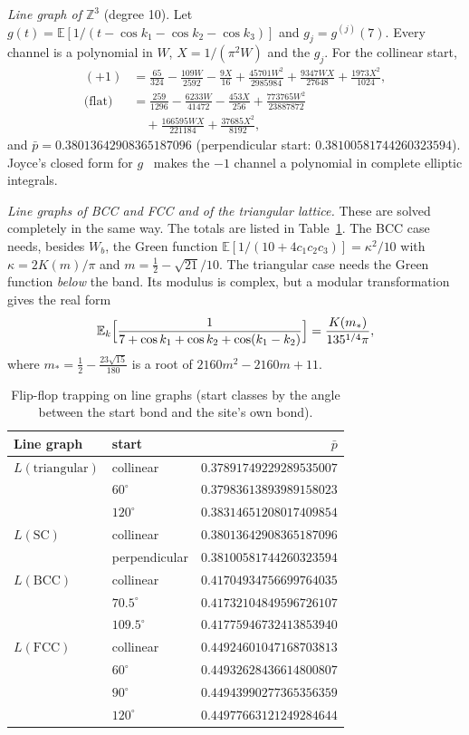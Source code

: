 \documentclass[aps,pra,10pt,twocolumn,superscriptaddress,nofootinbib]{revtex4-2}
\newcommand{\E}{\mathbb{E}}
\newcommand{\pbar}{\bar{p}}
\begin{document}
\emph{Line graph of $\mathbb{Z}^3$} (degree 10). Let $g(t)=\E[1/(t-\cos k_1-\cos k_2-\cos k_3)]$ and
$g_j=g^{(j)}(7)$. Every channel is a polynomial in $W$, $X=1/(\pi^2W)$ and the $g_j$. For the collinear start,
\begin{align}
(+1)&=\tfrac{65}{324}-\tfrac{109W}{2592}-\tfrac{9X}{16}+\tfrac{45701W^2}{2985984}
+\tfrac{9347WX}{27648}+\tfrac{1973X^2}{1024},\nonumber\\
\text{(flat)}&=\tfrac{259}{1296}-\tfrac{6233W}{41472}-\tfrac{453X}{256}
+\tfrac{773765W^2}{23887872}\nonumber\\
&\quad+\tfrac{166595WX}{221184}+\tfrac{37685X^2}{8192},
\end{align}
and $\pbar=0.38013642908365187096$ (perpendicular start: $0.38100581744260323594$).
Joyce's closed form for $g$~\cite{Joyce1994} makes the $-1$ channel a polynomial in
complete elliptic integrals.

\emph{Line graphs of BCC and FCC and of the triangular lattice.} These are solved completely
in the same way. The totals are listed in Table~\ref{tab:lg}. The BCC case needs, besides $W_b$,
the Green function $\E[1/(10+4c_1c_2c_3)]=\kappa^2/10$ with $\kappa=2K(m)/\pi$ and
$m=\tfrac12-\sqrt{21}/10$. The triangular case needs the Green function \emph{below} the band.
Its modulus is complex, but a modular transformation gives the real form
\begin{equation}
\E_k\Bigl[\frac1{7+\cos k_1+\cos k_2+\cos(k_1-k_2)}\Bigr]=\frac{K(m_*)}{135^{1/4}\pi},
\end{equation}
where $m_*=\tfrac12-\tfrac{23\sqrt{15}}{180}$ is a root of $2160m^2-2160m+11$.

\begin{table}
\caption{Flip-flop trapping on line graphs (start classes by the angle between the
start bond and the site's own bond).}
\label{tab:lg}
\begin{ruledtabular}
\begin{tabular}{llr}
Line graph & start & $\pbar$\\
\hline
$L(\text{triangular})$ & collinear & $0.37891749229289535007$\\
 & $60^\circ$ & $0.37983613893989158023$\\
 & $120^\circ$ & $0.38314651208017409854$\\
$L(\text{SC})$ & collinear & $0.38013642908365187096$\\
 & perpendicular & $0.38100581744260323594$\\
$L(\text{BCC})$ & collinear & $0.41704934756699764035$\\
 & $70.5^\circ$ & $0.41732104849596726107$\\
 & $109.5^\circ$ & $0.41775946732413853940$\\
$L(\text{FCC})$ & collinear & $0.44924601047168703813$\\
 & $60^\circ$ & $0.44932628436614800807$\\
 & $90^\circ$ & $0.44943990277365356359$\\
 & $120^\circ$ & $0.44977663121249284644$\\
\end{tabular}
\end{ruledtabular}
\end{table}
\end{document}
